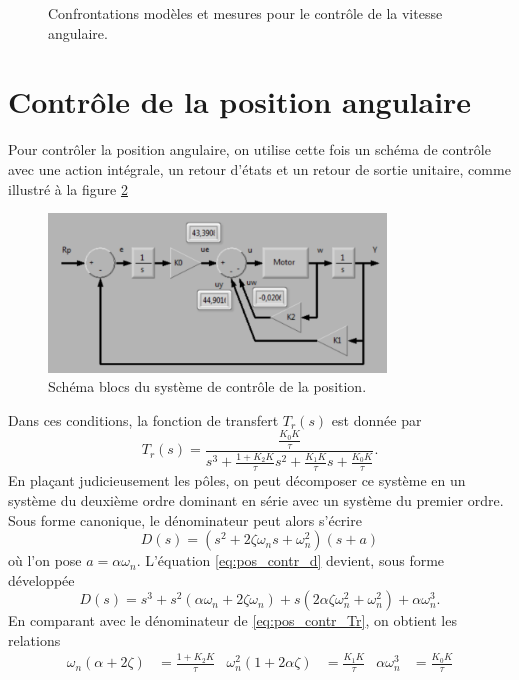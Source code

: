 \documentclass[frenchb, paper=a4, fontsize=11pt]{scrartcl}
\numberwithin{equation}{section}					%
\numberwithin{figure}{section}					%
\numberwithin{table}{section}						%
\begin{document}
\begin{figure}[ht]
	\centering
	
	\caption{Confrontations modèles et mesures pour le contrôle
	de la vitesse angulaire.}
	\label{fig:angular_speed_control}
\end{figure}

\section{Contrôle de la position angulaire}
Pour contrôler la position angulaire, on utilise cette fois un schéma de contrôle
avec une action intégrale, un retour d'états et un retour de sortie unitaire,
comme illustré à la figure \ref{fig:block_diagram_position_control}

\begin{figure}[ht]
	\centering
	\includegraphics[width=0.8\textwidth]{img/block_diagram_position_control.png}
	\caption{Schéma blocs du système de contrôle de la position.}
	\label{fig:block_diagram_position_control}
\end{figure}

Dans ces conditions, la fonction de transfert $T_r(s)$ est donnée par
\begin{equation}
	T_r(s) = \frac{\frac{K_0K}{\tau}}{s^3 + \frac{1+K_2K}{\tau}s^2 + \frac{K_1K}{\tau}s + \frac{K_0K}{\tau}}.
	\label{eq:pos_contr_Tr}
\end{equation}
En plaçant judicieusement les pôles, on peut décomposer ce système en un système
du deuxième ordre dominant en série avec un système du premier ordre. Sous forme
canonique, le dénominateur peut alors s'écrire
\begin{equation}
	D(s) = (s^2 + 2\zeta\omega_ns + \omega_n^2)(s+a)
	\label{eq:pos_contr_d}
\end{equation}
où l'on pose $a=\alpha \omega_n$. L'équation  \ref{eq:pos_contr_d} devient, sous forme développée
\begin{equation}
	D(s) = s^3 + s^2 (\alpha \omega_n + 2\zeta \omega_n) + s(2\alpha \zeta \omega_n^2 + \omega_n^2) + \alpha \omega_n^3.
	\label{eq:pos_contr_d_developp}
\end{equation}
En comparant avec le dénominateur de \ref{eq:pos_contr_Tr}, on obtient les relations
\begin{align}
\omega_n (\alpha + 2\zeta) &= \frac{1+K_2K}{\tau} &
\omega_n^2 (1+2\alpha \zeta) &= \frac{K_1K}{\tau} &
\alpha \omega_n^3 &= \frac{K_0K}{\tau} 
\end{align}
\end{document}
